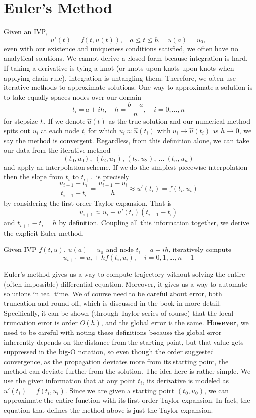 \documentclass[11pt]{article}
\begin{document}
\section{Euler's Method}

Given an IVP, $$u'(t) = f(t,u(t)), \quad a \leq t \leq b, \quad u(a) = u_0,$$ even with our existence and uniqueness conditions satisfied, we often have no analytical solutions. We cannot derive a closed form because integration is hard. If taking a derivative is tying a knot (or knots upon knots upon knots when applying chain rule), integration is untangling them. Therefore, we often use iterative methods to approximate solutions. 
One way to approximate a solution is to take equally spaces nodes over our domain $$t_i = a+ih, \quad h = \frac{b-a}{n}, \quad i = 0, ..., n$$
for stepsize $h$. If we denote $\hat{u}(t)$ as the true solution and our numerical method spits out $u_i$ at each node $t_i$ for which $u_i \approx \hat{u}(t_i)$ with $u_i \to \hat{u}(t_i)$ as $h \to 0$, we say the method is convergent. Regardless, from this definition alone, we can take our data from the iterative method $$(t_0, u_0), \ (t_2, u_1), \ (t_2, u_2), \ ... \ (t_n, u_n)$$ and apply an interpolation scheme. If we do the simplest piecewise interpolation then the slope from $t_i$ to $t_{i+1}$ is precisely $$\frac{u_{i+1}-u_i}{t_{i+1}-t_i} = \frac{u_{i+1}-u_i}{h} \approx u'(t_i) = f(t_i, u_i)$$ by considering the first order Taylor expansion. That is $$u_{i+1} \approx u_i + u'(t_i)(t_{i+1}-t_{i})$$ and $t_{i+1}-t_i = h$ by definition. Coupling all this information together, we derive the explicit Euler method. 
\begin{definition}
    Given IVP $f(t,u)$, $u(a) = u_0$ and node $t_i = a+ih$, iteratively compute $$u_{i+1} = u_i + hf(t_i,u_i), \quad i = 0, 1, ..., n-1$$
\end{definition}
Euler's method gives us a way to compute trajectory without solving the entire (often impossible) differential equation. Moreover, it gives us a way to automate solutions in real time. We of course need to be careful about error, both truncation and round off, which is discussed in the book in more detail. Specifically, it can be shown (through Taylor series of course) that the local truncation error is order $O(h)$, and the global error is the same. \textbf{However}, we need to be careful with noting these definitions because the global error inherently depends on the distance from the starting point, but that value gets suppressed in the big-O notation, so even though the order suggested convergence, as the propagation deviates more  from its starting point, the method can deviate further from the solution. 
\newpage
The idea here is rather simple. We use the given information that at any point $t_i$, its derivative is modeled as $u'(t_i)=f(t_i, u_i)$. Since we are given a starting point $(t_0, u_0)$, we can approximate the entire function with its first-order Taylor expansion. In fact, the equation that defines the method above is just the Taylor expansion. 
\end{document}
